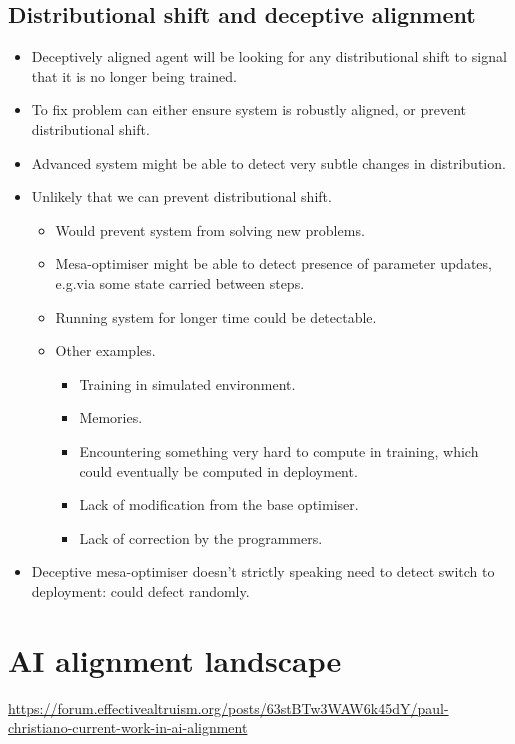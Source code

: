 \subsection{Distributional shift and deceptive alignment}

\begin{itemize}
    \item Deceptively aligned agent will be looking for any distributional shift to signal that it is no longer being trained.
    \item To fix problem can either ensure system is robustly aligned, or prevent distributional shift.
    \item Advanced system might be able to detect very subtle changes in distribution.
    \item Unlikely that we can prevent distributional shift.
    \begin{itemize}
        \item Would prevent system from solving new problems.
        \item Mesa-optimiser might be able to detect presence of parameter updates, e.g.\@ via some state carried between steps.
        \item Running system for longer time could be detectable.
        \item Other examples.
        \begin{itemize}
            \item Training in simulated environment.
            \item Memories.
            \item Encountering something very hard to compute in training, which could eventually be computed in deployment.
            \item Lack of modification from the base optimiser.
            \item Lack of correction by the programmers.
        \end{itemize}
    \end{itemize}
    \item Deceptive mesa-optimiser doesn't strictly speaking need to detect switch to deployment: could defect randomly.
\end{itemize}


\section{AI alignment landscape}

\url{https://forum.effectivealtruism.org/posts/63stBTw3WAW6k45dY/paul-christiano-current-work-in-ai-alignment}


